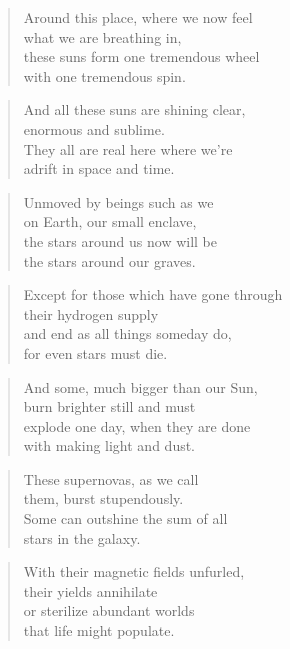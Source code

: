 \documentclass[14pt,a4paper]{article}
\begin{document}
\begin{verse}
Around this place, where we now feel\\
what we are breathing in,\\
these suns form one tremendous wheel\\
with one tremendous spin.
\end{verse}

\begin{verse}
And all these suns are shining clear,\\
enormous and sublime.\\
They all are real here where we’re\\
adrift in space and time.
\end{verse}

\begin{verse}
Unmoved by beings such as we\\
on Earth, our small enclave,\\
the stars around us now will be\\
the stars around our graves.
\end{verse}

\begin{verse}
Except for those which have gone through\\
their hydrogen supply\\
and end as all things someday do,\\
for even stars must die.
\end{verse}

\begin{verse}
And some, much bigger than our Sun,\\
burn brighter still and must\\
explode one day, when they are done\\
with making light and dust.
\end{verse}

\begin{verse}
These supernovas, as we call\\
them, burst stupendously.\\
Some can outshine the sum of all\\
stars in the galaxy.
\end{verse}

\begin{verse}
With their magnetic fields unfurled,\\
their yields annihilate\\
or sterilize abundant worlds\\
that life might populate.
\end{verse}
\end{document}
